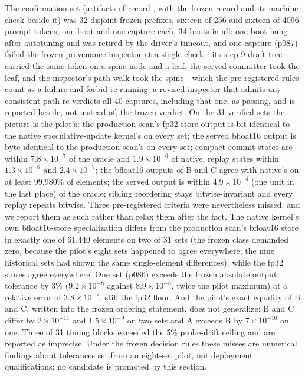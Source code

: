 \documentclass[conference]{IEEEtran}
\begin{document}
The confirmation set (artifacts of record , with the frozen record and its machine check beside it) was 32 disjoint frozen prefixes, sixteen of 256 and sixteen of 4096 prompt tokens, one boot and one capture each, 34 boots in all: one boot hung after autotuning and was retired by the driver's timeout, and one capture (p087) failed the frozen provenance inspector at a single check---its step-9 draft tree carried the same token on a spine node and a leaf, the served committer took the leaf, and the inspector's path walk took the spine---which the pre-registered rules count as a failure and forbid re-running; a revised inspector that admits any consistent path re-verdicts all 40 captures, including that one, as passing, and is reported beside, not instead of, the frozen verdict. On the 31 verified sets the picture is the pilot's: the production scan's fp32-store output is bit-identical to the native speculative-update kernel's on every set; the served bfloat16 output is byte-identical to the production scan's on every set; compact-commit states are within $7.8\times10^{-7}$ of the oracle and $1.9\times10^{-6}$ of native, replay states within $1.3\times10^{-6}$ and $2.4\times10^{-7}$; the bfloat16 outputs of B and C agree with native's on at least 99.980\% of elements; the served output is within $4.9\times10^{-4}$ (one unit in the last place) of the oracle; sibling reordering stays bitwise-invariant and every replay repeats bitwise. Three pre-registered criteria were nevertheless missed, and we report them as such rather than relax them after the fact. The native kernel's own bfloat16-store specialization differs from the production scan's bfloat16 store in exactly one of 61,440 elements on two of 31 sets (the frozen class demanded zero, because the pilot's eight sets happened to agree everywhere; the nine historical sets had shown the same single-element differences), while the fp32 stores agree everywhere. One set (p086) exceeds the frozen absolute output tolerance by 3\% ($9.2\times10^{-8}$ against $8.9\times10^{-8}$, twice the pilot maximum) at a relative error of $3.8\times10^{-7}$, still the fp32 floor. And the pilot's exact equality of B and C, written into the frozen ordering statement, does not generalize: B and C differ by $2\times10^{-11}$ and $1.5\times10^{-9}$ on two sets and A exceeds B by $7\times10^{-10}$ on one. Three of 31 timing blocks exceeded the 5\% probe-drift ceiling and are reported as imprecise. Under the frozen decision rules these misses are numerical findings about tolerances set from an eight-set pilot, not deployment qualifications; no candidate is promoted by this section.
\end{document}
